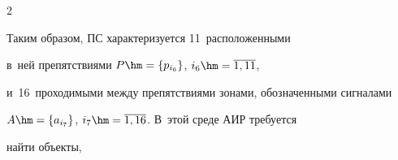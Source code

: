 \begin{multicols}{2}
   


   


  Таким образом, ПС характеризуется 11~расположенными 


в~ней препятствиями $P\hm= \{p_{i_6}\}$, $i_6\hm= \overline{1,11}$, 


и~16~проходимыми между препятствиями зонами, обозначенными сигналами 


$A\hm= \{ a_{i_7}\}$, $i_7\hm= \overline{1,16}$. В~этой среде АИР требуется 


найти объекты,\linebreak\vspace*{-12pt}





\pagebreak





\end{multicols}






